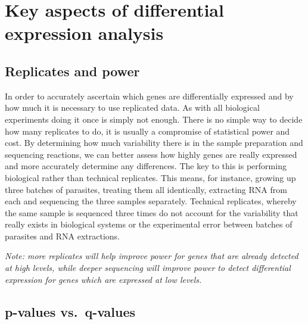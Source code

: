 \documentclass[11pt]{article}
\begin{document}



\newpage





    \hypertarget{key-aspects-of-differential-expression-analysis}{%
\section{Key aspects of differential expression
analysis}\label{key-aspects-of-differential-expression-analysis}}

    \hypertarget{replicates-and-power}{%
\subsection{Replicates and power}\label{replicates-and-power}}

In order to accurately ascertain which genes are differentially
expressed and by how much it is necessary to use replicated data. As
with all biological experiments doing it once is simply not enough.
There is no simple way to decide how many replicates to do, it is
usually a compromise of statistical power and cost. By determining how
much variability there is in the sample preparation and sequencing
reactions, we can better assess how highly genes are really expressed
and more accurately determine any differences. The key to this is
performing biological rather than technical replicates. This means, for
instance, growing up three batches of parasites, treating them all
identically, extracting RNA from each and sequencing the three samples
separately. Technical replicates, whereby the same sample is sequenced
three times do not account for the variability that really exists in
biological systems or the experimental error between batches of
parasites and RNA extractions.

\textit{Note: more replicates will help improve power for genes that are
already detected at high levels, while deeper sequencing will improve
power to detect differential expression for genes which are expressed at
low levels.}

\hypertarget{p-values-vs.-q-values}{%
\subsection{p-values vs.~q-values}\label{p-values-vs.-q-values}}
\end{document}
